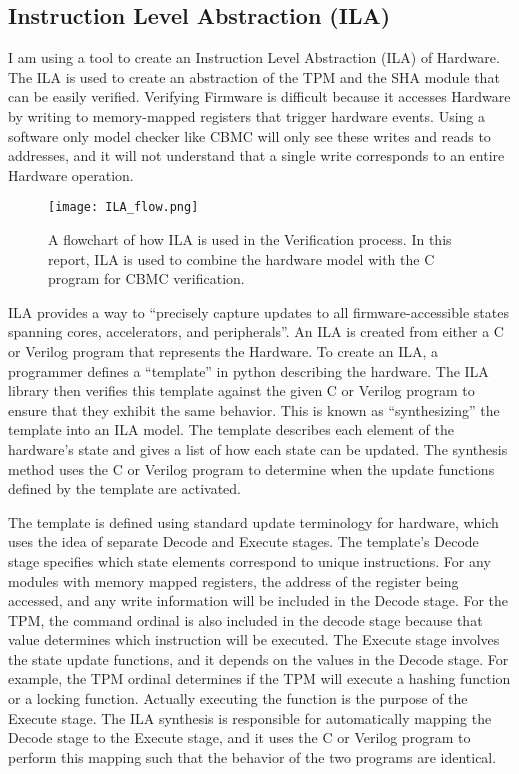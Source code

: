 \documentclass[../report.tex]{subfiles}
\begin{document}

\subsection{Instruction Level Abstraction (ILA)}

I am using a tool to create an Instruction Level Abstraction (ILA) of Hardware.
The ILA is used to create an abstraction of the TPM and the SHA module that can be
easily verified.
Verifying Firmware is difficult because it accesses Hardware by writing to
memory-mapped registers that trigger hardware events.
Using a software only model checker like CBMC will only see these writes
and reads to addresses, and it will not understand that a single write
corresponds to an entire Hardware operation.

\begin{figure}
  \centering
  \texttt{[image: ILA\_flow.png]}
  \caption{A flowchart of how ILA is used in the Verification process.
  In this report, ILA is used to combine the hardware model with the C program for CBMC verification.}
  \label{fig:ILA_flow}
\end{figure}

ILA provides a way to ``precisely capture updates to all firmware-accessible
states spanning cores, accelerators, and peripherals''\cite{ila-template}.
An ILA is created from either a C or Verilog program that represents the
Hardware.
To create an ILA, a programmer defines a ``template'' in python describing the
hardware.
The ILA library then verifies this template against the given C or Verilog
program to ensure that they exhibit the same behavior.
This is known as ``synthesizing'' the template into an ILA model.
The template describes each element of the hardware's state and gives a list of
how each state can be updated.
The synthesis method uses the C or Verilog program to determine when the update
functions defined by the template are activated.

The template is defined using standard update terminology for hardware, which
uses the idea of separate Decode and Execute stages.
The template's Decode stage specifies which state elements correspond to unique
instructions.
For any modules with memory mapped registers, the address of the register being
accessed, and any write information will be included in the Decode stage. 
For the TPM, the command ordinal is also included in the decode stage because
that value determines which instruction will be executed. %
The Execute stage involves the state update functions, and it depends on the
values in the Decode stage.
For example, the TPM ordinal determines if the TPM will execute a hashing
function or a locking function.
Actually executing the function is the purpose of the Execute stage.
The ILA synthesis is responsible for automatically mapping the Decode stage to
the Execute stage, and it uses the C or Verilog program to perform this mapping
such that the behavior of the two programs are identical.
\end{document}
